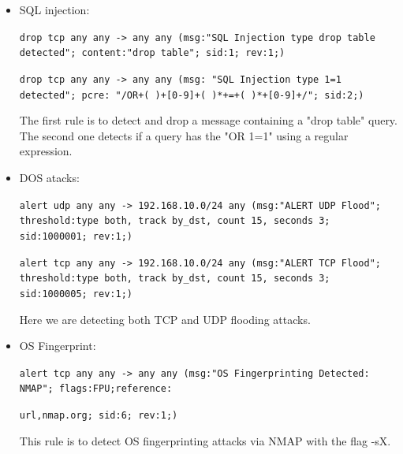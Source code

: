 \documentclass{article}
\begin{document}
\begin{itemize}
    \item SQL injection:\par
    \texttt{drop tcp any any -> any any (msg:"SQL Injection type drop table detected"; content:"drop table"; sid:1; rev:1;)}\par
    \texttt{drop tcp any any -> any any (msg: "SQL Injection type 1=1 detected"; pcre: "/OR+( )+[0-9]+( )*+=+( )*+[0-9]+/"; sid:2;)}\par
    \texttt{}\par
    The first rule is to detect and drop a message containing a "drop table" query. The second one detects if a query has the "OR 1=1" using a regular expression. \par
    

    \item DOS atacks:\par
    \texttt{alert udp any any -> 192.168.10.0/24 any (msg:"ALERT UDP Flood"; threshold:type both, track by_dst, count 15, seconds 3; sid:1000001; rev:1;)}\par
    \texttt{alert tcp any any -> 192.168.10.0/24 any (msg:"ALERT TCP Flood"; threshold:type both, track by_dst, count 15, seconds 3; sid:1000005; rev:1;)}\par

    \texttt{}\par
    Here we are detecting both TCP and UDP flooding attacks.\par


    \item OS Fingerprint:\par
    \texttt{alert tcp any any -> any any (msg:"OS Fingerprinting Detected: NMAP"; flags:FPU;reference:}\par
    \texttt{url,nmap.org; sid:6; rev:1;)}\par

    \texttt{}\par
    This rule is to detect OS fingerprinting attacks via NMAP with the flag -sX.  
    
    \texttt{}\par
\end{itemize}
\end{document}
